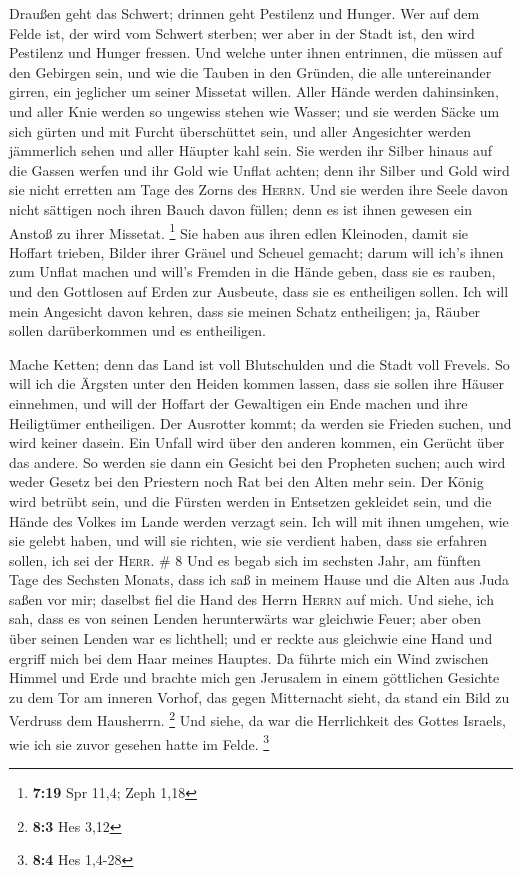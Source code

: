  Draußen geht das Schwert; drinnen geht Pestilenz und
Hunger. Wer auf dem Felde ist, der wird vom Schwert sterben; wer aber in
der Stadt ist, den wird Pestilenz und Hunger fressen. 
Und welche unter ihnen entrinnen, die müssen auf den Gebirgen sein, und
wie die Tauben in den Gründen, die alle untereinander girren, ein
jeglicher um seiner Missetat willen.  Aller Hände werden
dahinsinken, und aller Knie werden so ungewiss stehen wie Wasser;
 und sie werden Säcke um sich gürten und mit Furcht
überschüttet sein, und aller Angesichter werden jämmerlich sehen und
aller Häupter kahl sein.  Sie werden ihr Silber hinaus
auf die Gassen werfen und ihr Gold wie Unflat achten; denn ihr Silber
und Gold wird sie nicht erretten am Tage des Zorns des \textsc{Herrn}.
Und sie werden ihre Seele davon nicht sättigen noch ihren Bauch davon
füllen; denn es ist ihnen gewesen ein Anstoß zu ihrer Missetat.
\footnote{\textbf{7:19} Spr 11,4; Zeph 1,18}  Sie haben
aus ihren edlen Kleinoden, damit sie Hoffart trieben, Bilder ihrer
Gräuel und Scheuel gemacht; darum will ich's ihnen zum Unflat machen
 und will's Fremden in die Hände geben, dass sie es
rauben, und den Gottlosen auf Erden zur Ausbeute, dass sie es
entheiligen sollen.  Ich will mein Angesicht davon
kehren, dass sie meinen Schatz entheiligen; ja, Räuber sollen
darüberkommen und es entheiligen.

 Mache Ketten; denn das Land ist voll Blutschulden und
die Stadt voll Frevels.  So will ich die Ärgsten unter
den Heiden kommen lassen, dass sie sollen ihre Häuser einnehmen, und
will der Hoffart der Gewaltigen ein Ende machen und ihre Heiligtümer
entheiligen.  Der Ausrotter kommt; da werden sie Frieden
suchen, und wird keiner dasein.  Ein Unfall wird über den
anderen kommen, ein Gerücht über das andere. So werden sie dann ein
Gesicht bei den Propheten suchen; auch wird weder Gesetz bei den
Priestern noch Rat bei den Alten mehr sein.  Der König
wird betrübt sein, und die Fürsten werden in Entsetzen gekleidet sein,
und die Hände des Volkes im Lande werden verzagt sein. Ich will mit
ihnen umgehen, wie sie gelebt haben, und will sie richten, wie sie
verdient haben, dass sie erfahren sollen, ich sei der \textsc{Herr}. \#
8  Und es begab sich im sechsten Jahr, am fünften Tage des
Sechsten Monats, dass ich saß in meinem Hause und die Alten aus Juda
saßen vor mir; daselbst fiel die Hand des Herrn \textsc{Herrn} auf mich.
 Und siehe, ich sah, dass es von seinen Lenden
herunterwärts war gleichwie Feuer; aber oben über seinen Lenden war es
lichthell;  und er reckte aus gleichwie eine Hand und
ergriff mich bei dem Haar meines Hauptes. Da führte mich ein Wind
zwischen Himmel und Erde und brachte mich gen Jerusalem in einem
göttlichen Gesichte zu dem Tor am inneren Vorhof, das gegen Mitternacht
sieht, da stand ein Bild zu Verdruss dem Hausherrn. \footnote{\textbf{8:3}
  Hes 3,12}  Und siehe, da war die Herrlichkeit des Gottes
Israels, wie ich sie zuvor gesehen hatte im Felde. \footnote{\textbf{8:4}
  Hes 1,4-28}

